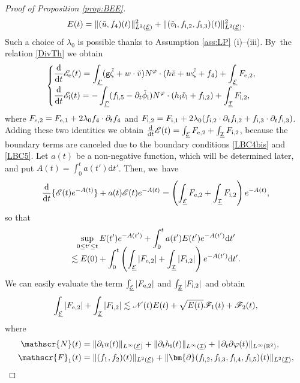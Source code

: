 \documentclass[10pt]{amsart}
\let\dpl\displaystyle
\newcommand{\gr}{{\mathtt g}}
\newcommand{\R}{{\mathbb R}}
\newcommand{\dt}{\partial_t}
\newcommand{\cI}{{\mathcal I}}
\newcommand{\cE}{{\mathcal E}}
\newcommand{\ul}[1]{\underline{#1}}
\newcommand{\itGamma}{\mathit{\Gamma}}
\theoremstyle{definition}
\begin{document}
\begin{proof}[Proof of Proposition \ref{prop:BEE}]
\[
E(t)=\|(\check{u},f_4)(t)\|_{L^2(\ul{\cE})}^2+\|(\check{v}_\mathrm{i},f_{{\rm i},2},f_{{\rm i},3})(t)\|_{L^2(\ul{\cE})}^2.
\]
Such a choice of $\lambda_0$ is possible thanks to Assumption \ref{ass:LP} (i)--(iii). By~the relation \eqref{DivTh} we obtain
\begin{equation}\label{BEI}
\begin{cases}
\dpl\frac{\rm d}{{\rm d}t}\mathscr{E}_\mathrm{e}(t) = \int_{\ul{\itGamma}}(\gr\check{\zeta}+w\cdot\check{v})N^\varphi\cdot(h\check{v}+w\check{\zeta}+f_4)
+ \int_{\ul{\cE}}F_{{\rm e},2}, \\[8pt]
\dpl\frac{\rm d}{{\rm d}t}\mathscr{E}_\mathrm{i}(t) = -\int_{\ul{\itGamma}}(f_{{\rm i},5}-\dt\check{\phi}_\mathrm{i})N^\varphi\cdot(h_\mathrm{i}\check{v}_\mathrm{i}+f_{{\rm i},2})
+ \int_{\ul{\cI}}F_{{\rm i},2},
\end{cases}
\end{equation}
where $F_{{\rm e},2}=F_{{\rm e},1}+2\lambda_0f_4\cdot\dt f_4$ and
$F_{{\rm i},2}=F_{{\rm i},1}+2\lambda_0(f_{{\rm i},2}\cdot\dt f_{{\rm i},2} + f_{{\rm i},3}\cdot\dt f_{{\rm i},3})$.
Adding these two identities we obtain $\frac{\rm d}{{\rm d}t}\mathscr{E}(t)=\int_{\ul{\cE}}F_{{\rm e},2}+\int_{\ul{\cI}}F_{{\rm i},2}$,
because the boundary terms are canceled due to the boundary conditions \eqref{LBC4bis} and \eqref{LBC5}.
Let $a(t)$ be a non-negative function, which will be determined later, and put $A(t)=\int_0^t a(t')\mathrm{d}t'$.
Then, we~have
\[
\frac{\rm d}{{\rm d}t}\{ \mathscr{E}(t)e^{-A(t)} \} + a(t)\mathscr{E}(t)e^{-A(t)}
= \left(\int_{\ul{\cE}}F_{{\rm e},2}+\int_{\ul{\cI}}F_{{\rm i},2} \right) e^{-A(t)},
\]
so that
\begin{multline*}
\sup_{0\leq t'\leq t}E(t')e^{-A(t')} +\int_0^t a(t')E(t')e^{-A(t')}{\rm d}t' \\[-8pt]
\lesssim E(0) + \int_0^t \left(\int_{\ul{\cE}}|F_{{\rm e},2}|+\int_{\ul{\cI}}|F_{{\rm i},2}| \right) e^{-A(t')} {\rm d}t'.
\end{multline*}
We can easily evaluate the term $\int_{\ul{\cE}}|F_{{\rm e},2}|$ and $\int_{\ul{\cI}}|F_{{\rm i},2}|$ and obtain
\[
\int_{\ul{\cE}}|F_{{\rm e},2}|+\int_{\ul{\cI}}|F_{{\rm i},2}|
\lesssim \mathscr{N}(t)E(t)+\sqrt{E(t)}\mathscr{F}_1(t)+\mathscr{F}_2(t),
\]
where
\begin{align*}
\mathscr{N}(t)
&= \|\dt u(t)\|_{L^\infty(\ul{\cE})}+\|\dt h_\mathrm{i}(t)\|_{L^\infty(\ul{\cI})}+\|\dt\partial\varphi(t)\|_{L^\infty(\R^2)}, \\
\mathscr{F}_1(t)
&= \|(f_1,f_2)(t)\|_{L^2(\ul{\cE})} + \|\bm{\partial}(f_{{\rm i},2},f_{{\rm i},3},f_{{\rm i},4},f_{{\rm i},5})(t)\|_{L^2(\ul{\cI})}, \\

\end{align*}
\end{proof}
\end{document}
